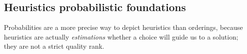 \documentclass{ws-ijait}
\begin{document}
%

\subsection{Heuristics probabilistic foundations}

Probabilities are a more precise way to depict heuristics than orderings, because heuristics are actually \emph{estimations} whether a choice will guide us to a solution; they are not a strict quality rank.
\end{document}
